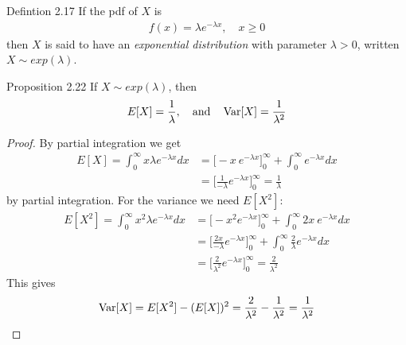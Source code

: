 \begin{boks}{Defintion 2.17}
  If the pdf of $X$ is
  \begin{align*}
    f(x) = \lambda e^{-\lambda x}, \quad x \geq 0
  \end{align*}
  then $X$ is said to have an \textit{exponential distribution} with parameter $\lambda > 0$, written $X \sim exp(\lambda)$.
\end{boks}

\begin{boks}{Proposition 2.22}
  If $X \sim exp(\lambda)$, then
  \begin{align*}
    E[X] = \frac{1}{\lambda}, \quad \text{and} \quad \operatorname{Var}[X] = \frac{1}{\lambda^2}
  \end{align*}
\end{boks}
\begin{proof}
  By partial integration we get
  \begin{align*}
    E[X] = \int_0^\infty x \lambda e^{-\lambda x}dx &= \Big[ -x \ e^{-\lambda x} \Big]_0^\infty + \int_0^\infty e^{-\lambda x} dx \\
    &= \Big[ \frac{1}{-\lambda} e^{-\lambda x} \Big]_0^\infty = \frac{1}{\lambda}
  \end{align*}
  by partial integration. For the variance we need $E[X^2]$:
  \begin{align*}
    E[X^2] = \int_0^\infty x^2 \lambda e^{-\lambda x}dx &= \Big[-x^2 e^{-\lambda x}\Big]_0^\infty + \int_0^\infty 2x \ e^{-\lambda x} dx \\
    &= \Big[ \frac{2x}{-\lambda} e^{-\lambda x} \Big]_0^\infty + \int_0^\infty \frac{2}{\lambda}e^{-\lambda x} dx \\
    &= \Big[ \frac{2}{\lambda^2} e^{-\lambda x} \Big]_0^\infty = \frac{2}{\lambda^2}
  \end{align*}
  This gives
  \begin{align*}
    \operatorname{Var}[X] = E[X^2] - (E[X])^2 = \frac{2}{\lambda^2} - \frac{1}{\lambda^2} =  \frac{1}{\lambda^2}
  \end{align*}
\end{proof}
